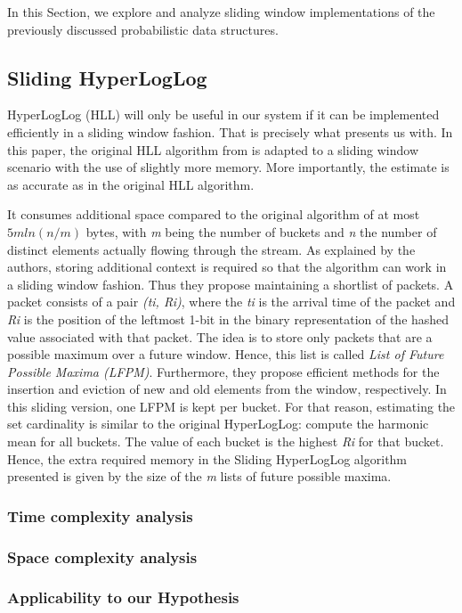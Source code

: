 In this Section, we explore and analyze sliding window implementations of the previously discussed probabilistic data structures.

\subsection{Sliding HyperLogLog}
HyperLogLog  (HLL) will only be useful in our system if it can be implemented efficiently in a sliding window fashion. That is precisely what \cite{Chabchoub-Sliding-HLL} presents us with. In this paper, the original HLL algorithm from \cite{Flajolet-HLL} is adapted to a sliding window scenario with the use of slightly more memory. More importantly, the estimate is as accurate as in the original HLL algorithm. 

It consumes additional space compared to the original algorithm of at most $5\textit{m}ln(\textit{n}/\textit{m})$ bytes, with \textit{m} being the number of buckets and \textit{n} the number of distinct elements actually flowing through the stream. As explained by the authors, storing additional context is required so that the algorithm can work in a sliding window fashion. Thus they propose maintaining a shortlist of packets. A packet consists of a pair \textit{(ti, Ri)}, where the \textit{ti} is the arrival time of the packet and \textit{Ri} is the position of the leftmost 1-bit in the binary representation of the hashed value associated with that packet. The idea is to store only packets that are a possible maximum over a future window. Hence, this list is called \textit{List of Future Possible Maxima (LFPM)}. Furthermore, they propose efficient methods for the insertion and eviction of new and old elements from the window, respectively. In this sliding version, one LFPM is kept per bucket. For that reason, estimating the set cardinality is similar to the original HyperLogLog: compute the harmonic mean for all buckets. The value of each bucket is the highest \textit{Ri} for that bucket. Hence, the extra required memory in the Sliding HyperLogLog algorithm presented is given by the size of the \textit{m} lists of future possible maxima.

\subsubsection{Time complexity analysis}

\subsubsection{Space complexity analysis}

\subsubsection{Applicability to our Hypothesis}

\fi

 